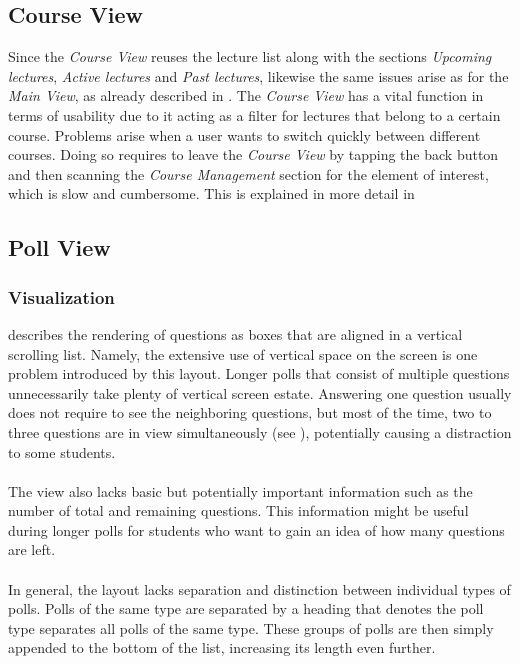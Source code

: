 \subsection{Course View}
\label{section:con:problems:courseview}
Since the \emph{Course View} reuses the lecture list along with the sections \emph{Upcoming lectures}, \emph{Active lectures} and \emph{Past lectures}, likewise the same issues arise as for the \emph{Main View}, as already described in . 
The \emph{Course View} has a vital function in terms of usability due to it acting as a filter for lectures that belong to a certain course. Problems arise when a user wants to switch quickly between different courses. Doing so requires to leave the \emph{Course View} by tapping the back button and then scanning the \emph{Course Management} section for the element of interest, which is slow and cumbersome. This is explained in more detail in 

\subsection{Poll View}

\subsubsection{Visualization}
\label{section:con:problems:pollview}

 describes the rendering of questions as boxes that are aligned in a vertical scrolling list. Namely, the extensive use of vertical space on the screen is one problem introduced by this layout. Longer polls that consist of multiple questions unnecessarily take plenty of vertical screen estate. 
Answering one question usually does not require to see the neighboring questions, but most of the time, two to three questions are in view simultaneously (see ), potentially causing a distraction to some students.
\\
\\
The view also lacks basic but potentially important information such as the number of total and remaining questions. This information might be useful during longer polls for students who want to gain an idea of how many questions are left.
\\
\\
In general, the layout lacks separation and distinction between individual types of polls.
Polls of the same type are separated by a heading that denotes the poll type separates all polls of the same type. These groups of polls are then simply appended to the bottom of the list, increasing its length even further.
\todogrf
